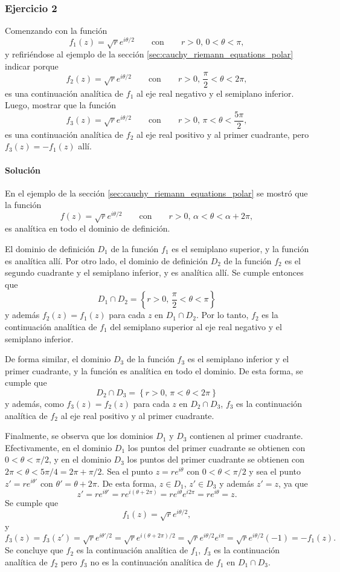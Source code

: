 \documentclass[a4paper]{report}
\begin{document}
\subsubsection{Ejercicio 2}

Comenzando con la función
\[
 f_1(z)=\sqrt{r}e^{i\theta/2}\qquad\textrm{con}\qquad r>0,\,0<\theta<\pi,
\]
y refiriéndose al ejemplo de la sección \ref{sec:cauchy_riemann_equations_polar} indicar porque
\[
 f_2(z)=\sqrt{r}e^{i\theta/2}\qquad\textrm{con}\qquad r>0,\,\frac{\pi}{2}<\theta<2\pi,
\]
es una continuación analítica de \(f_1\) al eje real negativo y el semiplano inferior. Luego, mostrar que la función 
\[
 f_3(z)=\sqrt{r}e^{i\theta/2}\qquad\textrm{con}\qquad r>0,\,\pi<\theta<\frac{5\pi}{2},
\]
es una continuación analítica de \(f_2\) al eje real positivo y al primer cuadrante, pero \(f_3(z)=-f_1(z)\) allí.

\paragraph{Solución} En el ejemplo de la sección \ref{sec:cauchy_riemann_equations_polar} se mostró que la función 
\[
 f(z)=\sqrt{r}e^{i\theta/2}\qquad\textrm{con}\qquad r>0,\,\alpha<\theta<\alpha+2\pi,
\]
es analítica en todo el dominio de definición. 

El dominio de definición \(D_1\) de la función \(f_1\) es el semiplano superior, y la función es analítica allí. Por otro lado, el dominio de definición \(D_2\) de la función \(f_2\) es el segundo cuadrante y el semiplano inferior, y es analítica allí. Se cumple entonces que 
\[
 D_1\cap D_2=\left\{r>0,\,\frac{\pi}{2}<\theta<\pi\right\}
\]
y además \(f_2(z)=f_1(z)\) para cada \(z\) en \(D_1\cap D_2\). Por lo tanto, \(f_2\) es la continuación analítica de \(f_1\) del semiplano superior al eje real negativo y el semiplano inferior.

De forma similar, el dominio \(D_3\) de la función \(f_3\) es el semiplano inferior y el primer cuadrante, y la función es analítica en todo el dominio. De esta forma, se cumple que 
\[
 D_2\cap D_3=\left\{r>0,\,\pi<\theta<2\pi\right\}
\]
y además, como \(f_3(z)=f_2(z)\) para cada \(z\) en \(D_2\cap D_3\), \(f_3\) es la continuación analítica de \(f_2\) al eje real positivo y al primer cuadrante.

Finalmente, se observa que los dominios \(D_1\) y \(D_3\) contienen al primer cuadrante. Efectivamente, en el dominio \(D_1\) los puntos del primer cuadrante se obtienen con \(0<\theta<\pi/2\), y en el dominio \(D_3\) los puntos del primer cuadrante se obtienen con \(2\pi<\theta<5\pi/4=2\pi+\pi/2\). Sea el punto \(z=re^{i\theta}\) con \(0<\theta<\pi/2\) y sea el punto \(z'=re^{i\theta'}\) con \(\theta'=\theta+2\pi\). De esta forma, \(z\in D_1\), \(z'\in D_3\) y además \(z'=z\), ya que
\[
 z'=re^{i\theta'}=re^{i(\theta+2\pi)}=re^{i\theta}e^{i2\pi}=re^{i\theta}=z.
\]
Se cumple que 
\[
 f_1(z)=\sqrt{r}e^{i\theta/2},
\]
y
\[
 f_3(z)=f_3(z')=\sqrt{r}e^{i\theta'/2}=\sqrt{r}e^{i(\theta+2\pi)/2}=\sqrt{r}e^{i\theta/2}e^{i\pi}=\sqrt{r}e^{i\theta/2}(-1)=-f_1(z).
\]
Se concluye que \(f_2\) es la continuación analítica de \(f_1\), \(f_3\) es la continuación analítica de \(f_2\) pero \(f_3\) no es la continuación analítica de \(f_1\) en \(D_1\cap D_3\).
\end{document}
